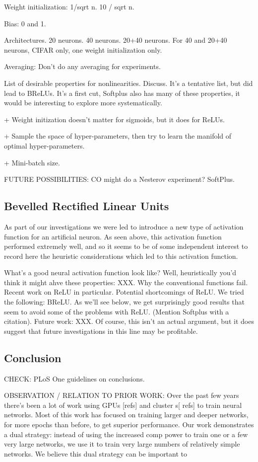 \documentclass[10pt]{article}
\begin{document}
Weight initialization: 1/sqrt n.  10 / sqrt n.

Bias: 0 and 1.

Architectures.  20 neurons. 40 neurons.  20+40 neurons.  For 40 and
20+40 neurons, CIFAR only, one weight initialization only.

Averaging: Don't do any averaging for experiments.

List of desirable properties for nonlinearities.  Discuss.  It's a
tentative list, but did lead to BReLUs.  It's a first cut, Softplus
also has many of these properties, it would be interesting to explore
more systematically.


+ Weight initization doesn't matter for sigmoids, but it does for ReLUs.

+ Sample the space of hyper-parameters, then try to learn the manifold
of optimal hyper-parameters.

+ Mini-batch size.

FUTURE POSSIBILITIES: CO might do a Nesterov experiment?  SoftPlus.

\subsection*{Bevelled Rectified Linear Units}

As part of our investigations we were led to introduce a new type of
activation function for an artificial neuron.  As seen above, this
activation function performed extremely well, and so it seems to be of
some independent interest to record here the heuristic considerations
which led to this activation function.

What's a good neural activation function look like?  Well,
heuristically you'd think it might ahve these properties: XXX.  Why
the conventional functions fail.  Recent work on ReLU in particular.
Potential shortcomings of ReLU.  We tried the following: BReLU.  As
we'll see below, we get surprisingly good results that seem to avoid
some of the problems with ReLU. (Mention Softplus with a citation).
Future work: XXX.  Of course, this isn't an actual argument, but it
does suggest that future investigations in this line may be
profitable.

\subsection*{Conclusion}

CHECK: PLoS One guidelines on conclusions.

OBSERVATION / RELATION TO PRIOR WORK: Over the past few years there's
been a lot of work using GPUs [refs] and cluster s[ refs] to train
neural networks.  Most of this work has focused on training larger and
deeper networks, for more epochs than before, to get superior
performance.  Our work demonstrates a dual strategy: instead of using
the increased comp power to train one or a few very large networks, we
use it to train very large numbers of relatively simple networks.  We
believe this dual strategy can be important to
\end{document}
